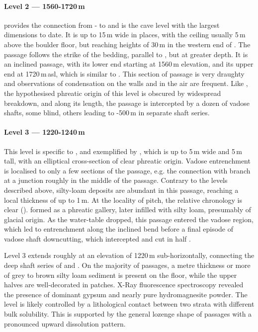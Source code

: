 \paragraph{Level 2 — 1560-1720\,m}

 provides the connection from - to  and is the cave level with the largest dimensions to date. 
It is up to 15\,m wide in places, with the ceiling usually 5\,m above the boulder floor, but reaching heights of 30\,m in the western end of . 
The passage follows the strike of the bedding, parallel to , but at greater depth. 
It is an inclined passage, with its lower end starting at 1560\,m elevation, and its upper end  at 1720\,m\,asl, which is similar to . 
This section of passage is very draughty and observations of condensation on the walls and in the air are frequent. 
Like , the hypothesised phreatic origin of this level is obscured by widespread breakdown, and along its length, the passage is intercepted by a dozen of vadose shafts, some blind, others leading to -500\,m in separate shaft series. 

\paragraph{Level 3 — 1220-1240\,m}
This level is specific to , and exemplified by , which is up to 5\,m wide and 5\,m tall, with an elliptical cross-section of clear phreatic origin. Vadose entrenchment is localised to only a few sections of the passage, e.g. the connection with  branch at a junction roughly in the middle of the passage. 
Contrary to the levels described above, silty-loam deposits are abundant in this passage, reaching a local thickness of up to 1\,m. 
At the locality of  pitch, the relative chronology is clear (). 
 formed as a phreatic gallery, later infilled with silty loam, presumably of glacial origin. 
As the water-table dropped, this passage entered the vadose region, which led to entrenchment along the inclined bend before a final episode of vadose shaft downcutting, which intercepted and cut in half .

Level 3 extends roughly at an elevation of 1220\,m sub-horizontally, connecting the deep shaft series of  and . 
On the majority of passages, a metre thickness or more of grey to brown silty loam sediment is present on the floor, while the upper halves are well-decorated in patches.
X-Ray fluorescence spectroscopy revealed the presence of dominant gypsum and nearly pure hydromagnesite powder.
The level is likely controlled by a lithological contact between two strata with different bulk solubility. 
This is supported by the general lozenge shape of passages with a pronounced upward dissolution pattern. 

